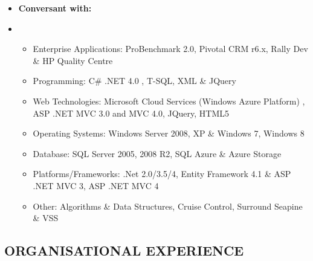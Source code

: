 \documentclass[]{article}
\begin{document}
\begin{itemize}
\item
  \textbf{Conversant with:}
\item
  \begin{itemize}
  \itemsep1pt\parskip0pt
  \item
    Enterprise Applications: ProBenchmark 2.0, Pivotal CRM r6.x, Rally
    Dev \& HP Quality Centre
  \item
    Programming: C\# .NET 4.0 , T-SQL, XML \& JQuery
  \item
    Web Technologies: Microsoft Cloud Services (Windows Azure Platform)
    , ASP .NET MVC 3.0 and MVC 4.0, JQuery, HTML5
  \item
    Operating Systems: Windows Server 2008, XP \& Windows 7, Windows 8
  \item
    Database: SQL Server 2005, 2008 R2, SQL Azure \& Azure Storage
  \item
    Platforms/Frameworks: .Net 2.0/3.5/4, Entity Framework 4.1 \& ASP
    .NET MVC 3, ASP .NET MVC 4
  \item
    Other: Algorithms \& Data Structures, Cruise Control, Surround
    Seapine \& VSS
  \end{itemize}
\end{itemize}

\subsection{ORGANISATIONAL EXPERIENCE}\label{organisational-experience}
\end{document}
